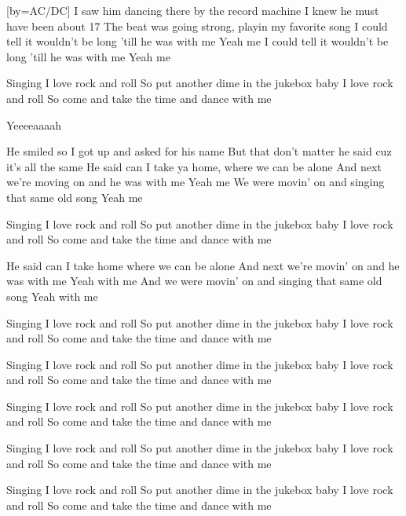 [by={AC/DC}]
\beginverse
I saw him dancing there by the record machine
I knew he must have been about 17
The beat was going strong, playin my favorite song
I could tell it wouldn't be long 'till he was with me
Yeah me
I could tell it wouldn't be long 'till he was with me
Yeah me
\endverse

\beginchorus
Singing I love rock and roll
So put another dime in the jukebox baby
I love rock and roll
So come and take the time and dance with me 
\endchorus

\beginverse 
Yeeeeaaaah
\endverse
 
\beginverse
He smiled so I got up and asked for his name
But that don't matter he said cuz it's all the same
He said can I take ya home, where we can be alone
And next we're moving on and he was with me
Yeah me
We were movin' on and singing that same old song
Yeah me
\endverse

\beginchorus
Singing I love rock and roll
So put another dime in the jukebox baby
I love rock and roll
So come and take the time and dance with me
\endchorus

\beginverse 
He said can I take home where we can be alone
And next we're movin' on and he was with me
Yeah with me
And we were movin' on and singing that same old song
Yeah with me
\endverse

\beginchorus
Singing I love rock and roll
So put another dime in the jukebox baby
I love rock and roll
So come and take the time and dance with me
\endchorus

\beginchorus
Singing I love rock and roll
So put another dime in the jukebox baby
I love rock and roll
So come and take the time and dance with me
\endchorus

\beginchorus
Singing I love rock and roll
So put another dime in the jukebox baby
I love rock and roll
So come and take the time and dance with me
\endchorus

\beginchorus
Singing I love rock and roll
So put another dime in the jukebox baby
I love rock and roll
So come and take the time and dance with me
\endchorus

\beginchorus
Singing I love rock and roll
So put another dime in the jukebox baby
I love rock and roll
So come and take the time and dance with me
\endchorus
\endsong
